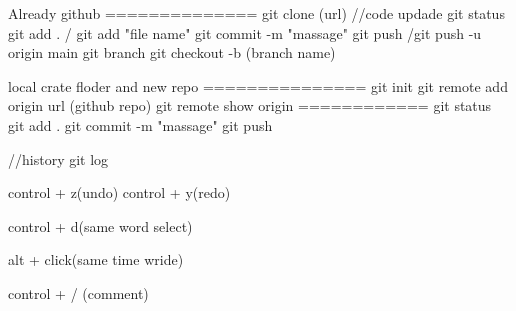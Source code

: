 
Already github
==============
git clone (url)
//code updade
git status
git add . / git add "file name"
git commit -m "massage"
git push /git push -u origin main
git branch
git checkout -b (branch name)

local crate floder and new repo
===============
git init
git remote add origin url (github repo)
git remote show origin
============
git status
git add .
git commit -m "massage"
git push

//history
git log

control + z(undo)
control + y(redo)

control + d(same word select)

alt + click(same time wride)

control + / (comment)